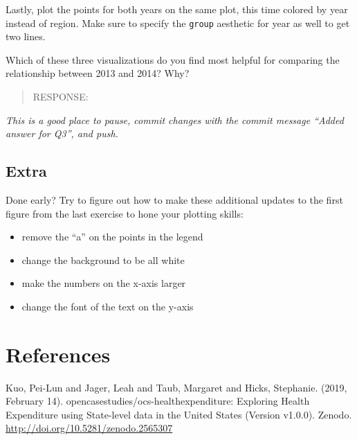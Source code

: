 \documentclass[
]{article}
\providecommand{\tightlist}{%
  \setlength{\itemsep}{0pt}\setlength{\parskip}{0pt}}
\begin{document}
Lastly, plot the points for both years on the same plot, this time
colored by year instead of region. Make sure to specify the
\texttt{group} aesthetic for year as well to get two lines.

Which of these three visualizations do you find most helpful for
comparing the relationship between 2013 and 2014? Why?

\begin{quote}
RESPONSE:
\end{quote}

\emph{This is a good place to pause, commit changes with the commit
message ``Added answer for Q3'', and push.}

\hypertarget{extra}{%
\subsection{Extra}\label{extra}}

Done early? Try to figure out how to make these additional updates to
the first figure from the last exercise to hone your plotting skills:

\begin{itemize}
\tightlist
\item
  remove the ``a'' on the points in the legend
\item
  change the background to be all white
\item
  make the numbers on the x-axis larger
\item
  change the font of the text on the y-axis
\end{itemize}

\hypertarget{references}{%
\section{References}\label{references}}

Kuo, Pei-Lun and Jager, Leah and Taub, Margaret and Hicks, Stephanie.
(2019, February 14). opencasestudies/ocs-healthexpenditure: Exploring
Health Expenditure using State-level data in the United States (Version
v1.0.0). Zenodo. \url{http://doi.org/10.5281/zenodo.2565307}
\end{document}
